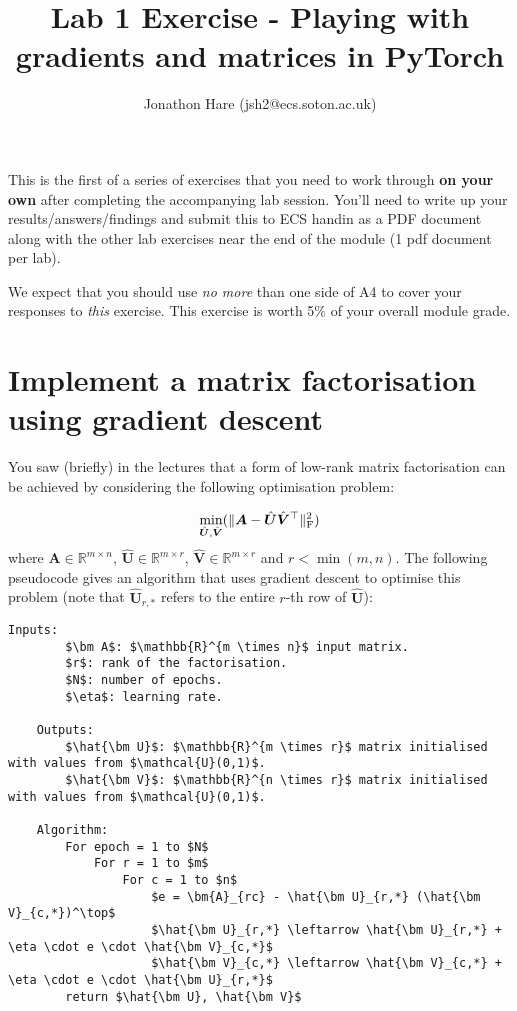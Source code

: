 \documentclass[a4paper]{article}
\begin{document}
\setlength{\leftskip}{20pt}
\title{Lab 1 Exercise - Playing with gradients and matrices in PyTorch}
\author{Jonathon Hare (jsh2@ecs.soton.ac.uk)}

\maketitle


This is the first of a series of exercises that you need to work through \textbf{on your own} after completing the accompanying lab session. You'll need to write up your results/answers/findings and submit this to ECS handin as a PDF document along with the other lab exercises near the end of the module (1 pdf document per lab). 

We expect that you should use \emph{no more} than one side of A4 to cover your responses to \emph{this} exercise. This exercise is worth 5\% of your overall module grade.

\section{Implement a matrix factorisation using gradient descent}\label{sgd}

You saw (briefly) in the lectures that a form of low-rank matrix factorisation can be achieved by considering the following optimisation problem:

\begin{equation}
	\min\limits_{\hat{\bm U}, \hat{\bm V}}( \| \bm A - \hat{\bm U}\hat{\bm V}^\top \|_{\rm F}^2 )
\end{equation}
where $\bm A \in \mathbb{R}^{m \times n}$, $\hat{\bm U} \in \mathbb{R}^{m \times r}$, $\hat{\bm V} \in \mathbb{R}^{m \times r}$ and $r<\min(m,n)$. The following pseudocode gives an algorithm that uses gradient descent to optimise this problem  (note that $\hat{\bm U}_{r,*}$ refers to the entire $r$-th row of $\hat{\bm U}$):

\begin{lstlisting}[mathescape=true,tabsize=4]
	Inputs: 
		$\bm A$: $\mathbb{R}^{m \times n}$ input matrix.
		$r$: rank of the factorisation.
		$N$: number of epochs.
		$\eta$: learning rate.

	Outputs:
		$\hat{\bm U}$: $\mathbb{R}^{m \times r}$ matrix initialised with values from $\mathcal{U}(0,1)$.
		$\hat{\bm V}$: $\mathbb{R}^{n \times r}$ matrix initialised with values from $\mathcal{U}(0,1)$.

	Algorithm:
		For epoch = 1 to $N$
			For r = 1 to $m$
				For c = 1 to $n$
					$e = \bm{A}_{rc} - \hat{\bm U}_{r,*} (\hat{\bm V}_{c,*})^\top$
					$\hat{\bm U}_{r,*} \leftarrow \hat{\bm U}_{r,*} + \eta \cdot e \cdot \hat{\bm V}_{c,*}$
					$\hat{\bm V}_{c,*} \leftarrow \hat{\bm V}_{c,*} + \eta \cdot e \cdot \hat{\bm U}_{r,*}$
		return $\hat{\bm U}, \hat{\bm V}$
\end{lstlisting}
\end{document}
